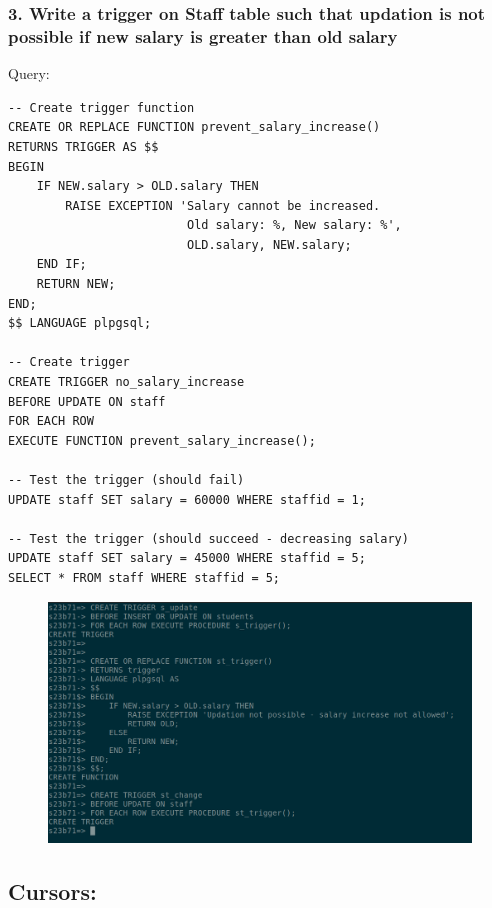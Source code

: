 \documentclass{article}
\begin{document}
\newpage
\subsubsection*{3. Write a trigger on Staff table such that updation is not possible if new salary is greater than old salary}
Query:
\begin{Verbatim}[frame=single,framerule=1pt,fontfamily=courier,fontsize=\small]
-- Create trigger function
CREATE OR REPLACE FUNCTION prevent_salary_increase()
RETURNS TRIGGER AS $$
BEGIN
    IF NEW.salary > OLD.salary THEN
        RAISE EXCEPTION 'Salary cannot be increased. 
                         Old salary: %, New salary: %', 
                         OLD.salary, NEW.salary;
    END IF;
    RETURN NEW;
END;
$$ LANGUAGE plpgsql;

-- Create trigger
CREATE TRIGGER no_salary_increase
BEFORE UPDATE ON staff
FOR EACH ROW
EXECUTE FUNCTION prevent_salary_increase();

-- Test the trigger (should fail)
UPDATE staff SET salary = 60000 WHERE staffid = 1;

-- Test the trigger (should succeed - decreasing salary)
UPDATE staff SET salary = 45000 WHERE staffid = 5;
SELECT * FROM staff WHERE staffid = 5;
\end{Verbatim}
\begin{figure}[H]
    \centering
    \includegraphics[width=\textwidth]{cycle6/6-3.png}
\end{figure}

\subsection*{Cursors:}
\end{document}
